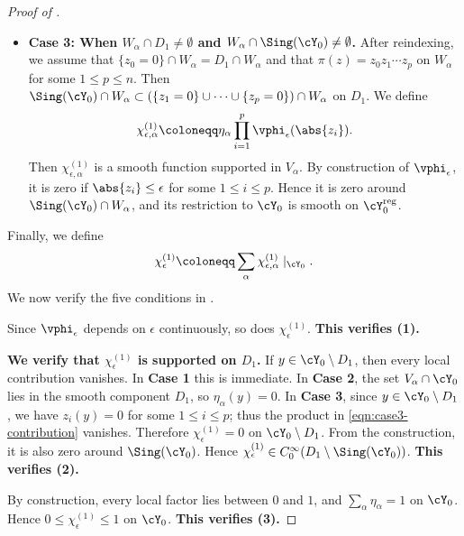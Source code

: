 \documentclass[12pt]{amsart}
\begin{document}
\begin{proof}[Proof of ]
\begin{itemize}
        \item \textbf{Case 3: When $W_\alpha\cap D_1\neq\emptyset$ and
        $W_\alpha\cap\Sing(\cY_0)\neq\emptyset$.}
        After reindexing, we assume that
        $\{z_0=0\}\cap W_\alpha=D_1\cap W_\alpha$ and that
        $\pi(z)=z_0z_1\cdots z_p$ on $W_\alpha$ for some $1\leq p\leq n$.
        Then
        $\Sing(\cY_0)\cap W_\alpha
        \subset(\{z_1=0\}\cup\cdots\cup\{z_p=0\})\cap W_\alpha$ on
        $D_1$. We define
        \begin{equation}
            \label{eqn:case3-contribution}
            \chi^{(1)}_{\epsilon,\alpha}
            \coloneqq
            \eta_\alpha\prod_{i=1}^p\vphi_\epsilon(\abs{z_i}).
        \end{equation}
        Then $\chi^{(1)}_{\epsilon,\alpha}$ is a smooth function supported
        in $V_\alpha$. By construction of $\vphi_\epsilon$, it is zero if
        $\abs{z_i}\leq\epsilon$ for some $1\leq i\leq p$. Hence it is zero
        around $\Sing(\cY_0)\cap W_\alpha$, and its restriction to
        $\cY_0$ is smooth on $\cY_0^{\rm reg}$.
    \end{itemize}
    Finally, we define
    \begin{equation}
        \label{eqn:final-test-by-adding-all}
        \chi^{(1)}_\epsilon
        \coloneqq
        \sum_\alpha\chi^{(1)}_{\epsilon,\alpha}\mid_{\cY_0}.
    \end{equation}
    We now verify the five conditions in
    .

    Since $\vphi_\epsilon$ depends on $\epsilon$ continuously, so does
    $\chi^{(1)}_\epsilon$. \textbf{This verifies (1).}

    \textbf{We verify that $\chi^{(1)}_\epsilon$ is supported on $D_1$.}
    If $y\in\cY_0\setminus D_1$, then every local contribution vanishes.
    In \textbf{Case 1} this is immediate. In \textbf{Case 2}, the set
    $V_\alpha\cap\cY_0$ lies in the smooth component $D_1$, so
    $\eta_\alpha(y)=0$. In \textbf{Case 3}, since $y\in\cY_0\setminus D_1$,
    we have $z_i(y)=0$ for some $1\leq i\leq p$; thus the product in
    \cref{eqn:case3-contribution} vanishes. Therefore
    $\chi^{(1)}_\epsilon=0$ on $\cY_0\setminus D_1$. From the construction,
    it is also zero around $\Sing(\cY_0)$. Hence
    $\chi^{(1)}_\epsilon\in C^\infty_0(D_1\setminus\Sing(\cY_0))$.
    \textbf{This verifies (2).}

    By construction, every local factor lies between $0$ and $1$, and
    $\sum_\alpha\eta_\alpha=1$ on $\cY_0$. Hence
    $0\leq\chi^{(1)}_\epsilon\leq 1$ on $\cY_0$.
    \textbf{This verifies (3).}


\end{proof}
\end{document}
